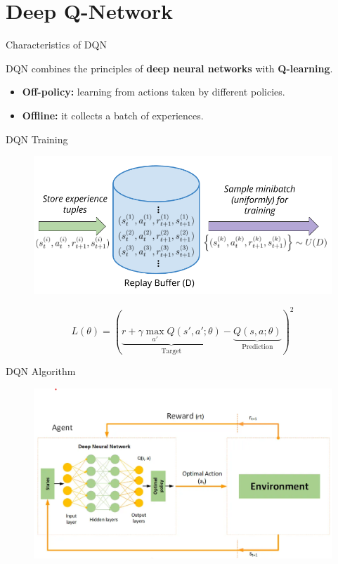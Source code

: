 \documentclass[serif]{beamer}  %
\begin{document}
\section{Deep Q-Network}


\begin{frame}{Characteristics of DQN}

    DQN combines the principles of \textbf{deep neural networks} with \textbf{Q-learning}.
    \vspace{1cm}
    \begin{itemize}
        \item \textbf{Off-policy:} learning from actions taken by different policies.
        \vspace{0.5cm}
        \item \textbf{Offline:} it collects a batch of experiences.
    \end{itemize}
\end{frame}

\begin{frame}{DQN Training}
    \begin{figure}
        \centering
        \includegraphics[width=0.8\linewidth]{images/experience_replay_buffer.png}
    \end{figure}
    \[L(\theta) = \left( \underbrace{r + \gamma \max_{a'} Q(s', a'; \theta)}_{\text{Target}} - \underbrace{Q(s, a; \theta)}_{\text{Prediction}} \right)^2\]
\end{frame}

\begin{frame}{DQN Algorithm}
    \begin{figure}
        \centering
        \includegraphics[width=\linewidth]{images/DQN_diagram.png}
    \end{figure}
\end{frame}
\end{document}
